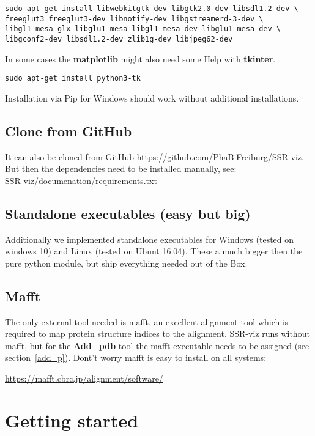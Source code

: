 \documentclass[a4paper,10pt]{article}
\begin{document}
\begin{verbatim}
sudo apt-get install libwebkitgtk-dev libgtk2.0-dev libsdl1.2-dev \
freeglut3 freeglut3-dev libnotify-dev libgstreamerd-3-dev \
libgl1-mesa-glx libglu1-mesa libgl1-mesa-dev libglu1-mesa-dev \
libgconf2-dev libsdl1.2-dev zlib1g-dev libjpeg62-dev
\end{verbatim}

In some cases the \textbf{matplotlib} might also need some Help with \textbf{tkinter}.

\begin{verbatim}
sudo apt-get install python3-tk
\end{verbatim}

Installation via Pip for Windows should work without additional installations.

\subsection{Clone from GitHub}

It can also be cloned from GitHub \url{https://github.com/PhaBiFreiburg/SSR-viz}.
But then the dependencies need to be installed manually, 
see: \\
SSR-viz/documenation/requirements.txt

\subsection{Standalone executables (easy but big)}

Additionally we implemented standalone 
executables for Windows (tested on windows 10) and Linux (tested on Ubunt 16.04).
These a much bigger then the pure python module, but ship everything needed out of
the Box. 

\subsection{Mafft}

The only external tool needed is mafft, an excellent alignment tool which is 
required to map protein structure indices to the alignment. SSR-viz runs
without mafft, but for the \textbf{Add\_pdb} tool the mafft executable needs 
to be assigned (see section~\ref{add_p}).
Dont't worry mafft is easy to install on all systems:

\url{https://mafft.cbrc.jp/alignment/software/}

\section{Getting started}
\end{document}

